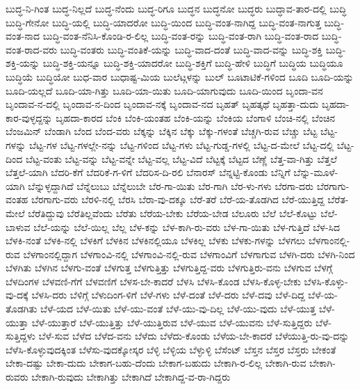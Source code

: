 {ಬುದ್ಧ-ನಿ-ಗಿಂತ
ಬುದ್ಧ-ನಿಲ್ಲದೆ
ಬುದ್ಧ-ನೆಂದು
ಬುದ್ಧ-ರಿಗೂ
ಬುದ್ಧನ
ಬುದ್ಧನೋ
ಬುದ್ಧರು
ಬುದ್ಧಾವ-ತಾರ-ದಲ್ಲಿ
ಬುದ್ಧಿ
ಬುದ್ಧಿ-ಗೇನೋ
ಬುದ್ಧಿ-ಯಲ್ಲಿ
ಬುದ್ಧಿ-ಯಾದರೋ
ಬುದ್ಧಿ-ಯಿಂದ
ಬುದ್ಧಿ-ವಂತ-ನಾಗಿದ್ದ
ಬುದ್ಧಿ-ವಂತ-ನಾಗುತ್ತ
ಬುದ್ಧಿ-ವಂತ-ನಾದ
ಬುದ್ಧಿ-ವಂತ-ನೆನಿಸಿ-ಕೊಂಡಿ-ರ-ಲಿಲ್ಲ
ಬುದ್ಧಿ-ವಂತ-ರನ್ನು
ಬುದ್ಧಿ-ವಂತ-ರಾಗಿ
ಬುದ್ಧಿ-ವಂತ-ರಾದ
ಬುದ್ಧಿ-ವಂತ-ರಾದ-ವರು
ಬುದ್ಧಿ-ವಂತರು
ಬುದ್ಧಿ-ವಂತಿಕೆ-ಯನ್ನು
ಬುದ್ಧಿ-ವಾದ-ದಂತೆ
ಬುದ್ಧಿ-ವಾದ-ವನ್ನು
ಬುದ್ಧಿ-ಶಕ್ತಿ
ಬುದ್ಧಿ-ಶಕ್ತಿ-ಯನ್ನು
ಬುದ್ಧಿ-ಶಕ್ತಿ-ಯನ್ನೂ
ಬುದ್ಧಿ-ಶಕ್ತಿ-ಯಾದರೋ
ಬುದ್ಧಿ-ಶಕ್ತಿಗೆ
ಬುದ್ಧಿ-ಹೇಳಿ
ಬುದ್ಧಿಗೆ
ಬುದ್ಧಿಯ
ಬುದ್ಧಿಯೂ
ಬುದ್ಧಿಯೆ
ಬುದ್ಧಿಯೋ
ಬುಧ-ವಾರ
ಬುಧಾಷ್ಟ-ಮಿಯ
ಬುಲೆಟ್ಗಳನ್ನು
ಬುಲ್
ಬೂಟಾಟಿಕೆ-ಗಳಿಂದ
ಬೂದಿ
ಬೂದಿ-ಯನ್ನು
ಬೂದಿ-ಯಲ್ಲದೆ
ಬೂದಿ-ಯಾ-ಗಿತ್ತು
ಬೂದಿ-ಯಾ-ಯಿತು
ಬೂದಿ-ಯಾಗುವುದು
ಬೂದಿ-ಯಿಂದ
ಬೃಂದಾ-ವನ
ಬೃಂದಾವ-ನ-ದಲ್ಲಿ
ಬೃಂದಾವ-ನ-ದಿಂದ
ಬೃಂದಾವ-ನಕ್ಕೆ
ಬೃಂದಾವ-ನದ
ಬೃಹತ್
ಬೃಹತ್ಕಥೆ
ಬೃಹತ್ತಾ-ದುದು
ಬೃಹದಾ-ಕಾರ-ವುಳ್ಳದ್ದನ್ನು
ಬೃಹದಾ-ಕಾರದ
ಬೆಂಕಿ
ಬೆಂಕಿ-ಯಂತಹ
ಬೆಂಕಿ-ಯನ್ನು
ಬೆಂಕಿಯ
ಬೆಂಗಾಳಿ
ಬೆಂಚಿ-ನಲ್ಲಿ
ಬೆಂಚಿನ
ಬೆಂಜಮಿನ್
ಬೆಂಡಾಗಿ
ಬೆಂದ
ಬೆಂದ-ವರು
ಬೆಕ್ಕನ್ನು
ಬೆಕ್ಕಿನ
ಬೆಕ್ಕು
ಬೆಕ್ಕು-ಗಳಂತೆ
ಬೆಚ್ಚಗಿ-ರುವ
ಬೆಚ್ಚು
ಬೆಟ್ಟ
ಬೆಟ್ಟ-ಗಳನ್ನು
ಬೆಟ್ಟ-ಗಳ
ಬೆಟ್ಟ-ಗಳಲ್ಲೇ-ನನ್ನು
ಬೆಟ್ಟ-ಗಳಿಂದ
ಬೆಟ್ಟ-ಗಳು
ಬೆಟ್ಟ-ಗುಡ್ಡ-ಗಳಲ್ಲಿ
ಬೆಟ್ಟ-ದ-ಮೇಲೆ
ಬೆಟ್ಟ-ದಲ್ಲಿ
ಬೆಟ್ಟ-ದಿಂದ
ಬೆಟ್ಟ-ವಂತು
ಬೆಟ್ಟ-ವನ್ನು
ಬೆಟ್ಟ-ವನ್ನೇ
ಬೆಟ್ಟ-ವಲ್ಲ
ಬೆಟ್ಟ-ವಿದೆ
ಬೆಟ್ಟಕ್ಕೆ
ಬೆಟ್ಟದ
ಬೆಣ್ಣೆ
ಬೆತ್ತ-ವಾ-ಗಿತ್ತು
ಬೆತ್ತಲೆ
ಬೆತ್ತಲೆ-ಯಾಗಿ
ಬೆದರಿ-ಕೆಗೆ
ಬೆದರಿಕೆ-ಗ-ಳಿಗೆ
ಬೆದರಿಸ-ದಿ-ರಲಿ
ಬೆನಾರಸ್
ಬೆನ್ನಟ್ಟಿ-ಕೊಂಡು
ಬೆನ್ನಿಗೆ
ಬೆನ್ನು-ಮೂಳೆ-ಯಾಗಿ
ಬೆನ್ನುಳ್ಳದ್ದಾಗಿದೆ
ಬೆನ್ನೆಲುಬು
ಬೆನ್ನೆಲುಬೇ
ಬೆರ-ಗಾ-ಯಿತು
ಬೆರ-ಗಾಗಿ
ಬೆರ-ಳು-ಗಳು
ಬೆರಗಾ-ದರು
ಬೆರಗಾಗು-ವಂತಹ
ಬೆರಗಾಗು-ವರು
ಬೆರಳಿ-ನಲ್ಲಿ
ಬೆರಸಿ
ಬೆರಾ-ವು-ದಕ್ಕೂ
ಬೆರೆ-ತರೆ
ಬೆರೆ-ಯ-ತೊಡಗಿದ
ಬೆರೆ-ಯುತ್ತಿದ್ದ
ಬೆರೆತ-ಮೇಲೆ
ಬೆರೆತಿದ್ದುವು
ಬೆರೆತಿಲ್ಲವೆಂದು
ಬೆರೆತು
ಬೆರೆಯ-ಬೇಕು
ಬೆರೆಯ-ಬೇಡ
ಬೆಲೂರು
ಬೆಲೆ
ಬೆಲೆ-ಕೊಟ್ಟು
ಬೆಲೆ-ಬಾಳುವ
ಬೆಲೆ-ಯನ್ನು
ಬೆಲೆ-ಯಿಲ್ಲ
ಬೆಲ್ಲ
ಬೆಳ-ಕನ್ನು
ಬೆಳ-ಕಾಗಿ-ರು-ವರು
ಬೆಳ-ಗಾ-ಯಿತು
ಬೆಳ-ಗುತ್ತಿದೆ
ಬೆಳ-ಸಿದ
ಬೆಳಕಿ-ನಂತೆ
ಬೆಳಕಿ-ನಲ್ಲಿ
ಬೆಳಕಿಗೆ
ಬೆಳಕಿನ
ಬೆಳಕಿನಲ್ಲಿಯೂ
ಬೆಳಕಿಲ್ಲ
ಬೆಳಕು
ಬೆಳಕು-ಗಳನ್ನು
ಬೆಳಗಲು
ಬೆಳಗಾಂನಲ್ಲಿ-ರುವ
ಬೆಳಗಾಂನಲ್ಲಿದ್ದಾಗ
ಬೆಳಗಾಂವಿ-ನಲ್ಲಿ
ಬೆಳಗಾಂವಿ-ನಲ್ಲಿ-ರುವ
ಬೆಳಗಾಂವಿಗೆ
ಬೆಳಗಾಗುವ
ಬೆಳಗಿ-ದರು
ಬೆಳಗಿ-ನಿಂದ
ಬೆಳಗಿತು
ಬೆಳಗಿನ
ಬೆಳಗು-ವಂತೆ
ಬೆಳಗುತ್ತ
ಬೆಳಗುತ್ತಿತ್ತು
ಬೆಳಗುತ್ತಿದ್ದ-ವರು
ಬೆಳಗುತ್ತಿರು-ವನು
ಬೆಳಗುವ
ಬೆಳಗ್ಗೆ
ಬೆಳದಿಂಗಳ
ಬೆಳವಣಿ-ಗೆಗೆ
ಬೆಳವಣಿಗೆ
ಬೆಳಸ-ಬೇ-ಕಾದರೆ
ಬೆಳಸಿ
ಬೆಳಸಿ-ಕೊಂಡ
ಬೆಳಸಿ-ಕೊಳ್ಳ-ಬೇಕು
ಬೆಳಸಿ-ಕೊಳ್ಳು-ವು-ದಕ್ಕೆ
ಬೆಳಸಿ-ದರು
ಬೆಳಿಗ್ಗೆ
ಬೆಳುದಿಂಗ-ಳಿಗೆ
ಬೆಳೆ-ಗಳು
ಬೆಳೆ-ದಂತೆ
ಬೆಳೆ-ದರು
ಬೆಳೆ-ದವು
ಬೆಳೆ-ದಿದ್ದ
ಬೆಳೆ-ಯ-ತೊಡಗಿತು
ಬೆಳೆ-ಯದ
ಬೆಳೆ-ಯಿತು
ಬೆಳೆ-ಯು-ವಂತೆ
ಬೆಳೆ-ಯು-ವು-ದಿಲ್ಲ
ಬೆಳೆ-ಯು-ವುದು
ಬೆಳೆ-ಯುತ್ತ
ಬೆಳೆ-ಯುತ್ತಾ
ಬೆಳೆ-ಯುತ್ತಾರೆ
ಬೆಳೆ-ಯುತ್ತಿತ್ತು
ಬೆಳೆ-ಯುತ್ತಿರುವ
ಬೆಳೆ-ಯುವ
ಬೆಳೆ-ಯುವನು
ಬೆಳೆ-ಸುತ್ತಿದ್ದರು
ಬೆಳೆ-ಸುತ್ತಿದ್ದಳು
ಬೆಳೆ-ಸುವ
ಬೆಳೆದ
ಬೆಳೆದ-ವನು
ಬೆಳೆದು
ಬೆಳೆದು-ಕೊಂಡು
ಬೆಳೆಯ-ಬೇ-ಕಾದರೆ
ಬೆಳೆಯುತ್ತಿ-ರು-ವು-ದನ್ನು
ಬೆಳೆಸಿ-ಕೊಳ್ಳುವುದಕ್ಕಿಂತ
ಬೆಳೆಸು-ವುದಕ್ಕೋಸ್ಕರ
ಬೆಳ್ಳಿ
ಬೆಳ್ಳಿಯ
ಬೆಳ್ಳುಳ್ಳಿ
ಬೆಸೆಂಟ್
ಬೆಸ್ತನ
ಬೆಸ್ತರ
ಬೆಸ್ತರು
ಬೇಕಂತೆ
ಬೇಕಾ-ದಷ್ಟು
ಬೇಕಾ-ದುದು
ಬೇಕಾಗ-ಬಹು-ದೆಂದು
ಬೇಕಾಗ-ಬಹುದು
ಬೇಕಾಗಿ-ರ-ಲಿಲ್ಲ
ಬೇಕಾಗಿ-ರುವ
ಬೇಕಾಗಿ-ರುವರು
ಬೇಕಾಗಿ-ರುವುದು
ಬೇಕಾಗಿತ್ತು
ಬೇಕಾಗಿದೆ
ಬೇಕಾಗಿದ್ದ-ವ-ರಾ-ಗಿದ್ದರು
}

